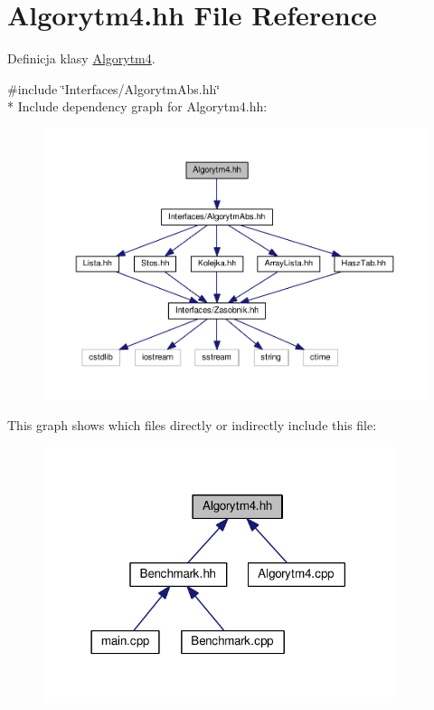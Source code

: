 \hypertarget{a00025}{}\section{Algorytm4.\+hh File Reference}
\label{a00025}


Definicja klasy \hyperlink{a00005}{Algorytm4}.  


{\ttfamily \#include \char`\"{}Interfaces/\+Algorytm\+Abs.\+hh\char`\"{}}\\*
Include dependency graph for Algorytm4.\+hh\+:
\nopagebreak
\begin{figure}[H]
\begin{center}
\leavevmode
\includegraphics[width=350pt]{a00063}
\end{center}
\end{figure}
This graph shows which files directly or indirectly include this file\+:
\nopagebreak
\begin{figure}[H]
\begin{center}
\leavevmode
\includegraphics[width=290pt]{a00064}
\end{center}
\end{figure}
